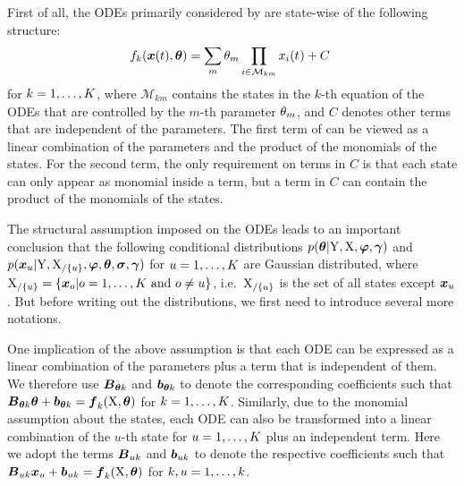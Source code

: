 First of all, the ODEs primarily considered by \cite{gorbach2017scalable} are state-wise of the following structure:
\begin{align}
    f_{k}(\boldsymbol{x}(t), \boldsymbol{\theta}) = \sum_m{\theta_{m}\prod_{i\in\mathcal{M}_{km}}{x_{i}(t_{})}} + C
    \label{eq-vgmgp-odes}\
\end{align}
for $k = 1,\dots,K$, where $\mathcal{M}_{km}$ contains the states in the $k$-th equation of the ODEs that are controlled by the $m$-th parameter $\theta_{m}$, and $C$ denotes other terms that are independent of the parameters.
The first term of \refequationp{\ref{eq-vgmgp-odes}} can be viewed as a linear combination of the parameters and the product of the monomials of the states.
For the second term, the only requirement on terms in $C$ is that each state can only appear as monomial inside a term, but a term in $C$ can contain the product of the monomials of the states.

The structural assumption imposed on the ODEs leads to an important conclusion that the  following conditional distributions $p(\boldsymbol{\theta}\vert\mathrm{Y},\mathrm{X},\boldsymbol{\varphi},\boldsymbol{\gamma})$ and $p(\boldsymbol{x}_{u}\vert\mathrm{Y},\mathrm{X}_{/\{u\}},\boldsymbol{\varphi},\boldsymbol{\theta},\boldsymbol{\sigma},\boldsymbol{\gamma})$ for $u = 1,\dots,K$ are Gaussian distributed, where $\mathrm{X}_{/\{u\}} = \{\boldsymbol{x}_{o}\vert o = 1,\dots,K\ \text{and}\ o \neq u \}$, i.e.\ $\mathrm{X}_{/\{u\}}$ is the set of all states except $\boldsymbol{x}_{u}$. 
But before writing out the distributions, we first need to introduce several more notations. 

One implication of the above assumption is that each ODE can be expressed as a linear combination of the parameters plus a term that is independent of them.
We therefore use $\boldsymbol{B}_{\boldsymbol{\theta}{k}}$ and $\boldsymbol{b}_{\boldsymbol{\theta}{k}}$ to denote the corresponding coefficients such that $\boldsymbol{B}_{\boldsymbol{\theta}{k}}\boldsymbol{\theta} + \boldsymbol{b}_{\boldsymbol{\theta}{k}} = \boldsymbol{f}_{k}(\mathrm{X}, \boldsymbol{\theta})$ for $k = 1,\dots,K$.
Similarly, due to the monomial assumption about the states, each ODE can also be transformed into a linear combination of the $u$-th state for $u = 1,\dots,K$ plus an independent term.
Here we adopt the terms $\boldsymbol{B}_{u{k}}$ and $\boldsymbol{b}_{u{k}}$ to denote the respective coefficients such that $\boldsymbol{B}_{u{k}}\boldsymbol{x}_{u} + \boldsymbol{b}_{u{k}} = \boldsymbol{f}_{k}(\mathrm{X}, \boldsymbol{\theta})$ for $k,u = 1,\dots,k$.

